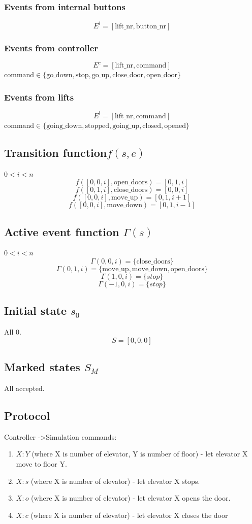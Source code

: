 \documentclass[12pt]{article}
\begin{document}
\subsubsection{Events from internal buttons}
\[ E^i = [\text{lift\_nr},\text{button\_nr}] \]

\subsubsection{Events from controller}
\[ E^c = [\text{lift\_nr}, \text{command}] \]
\(\text{command} \in \{\text{go\_down},\text{stop},\text{go\_up},\text{close\_door},\text{open\_door}\}\)

\subsubsection{Events from lifts}
\[ E^l = [\text{lift\_nr}, \text{command}] \]
\(\text{command} \in \{\text{going\_down},\text{stopped},\text{going\_up},\text{closed},\text{opened}\}\)

\subsection{Transition function\(f(s,e)\)}
\(0 < i < n\)
\[ f([0,0,i],\text{open\_doors}) = [0,1,i]\]
\[ f([0,1,i],\text{close\_doors}) = [0,0,i]\]
\[ f([0,0,i],\text{move\_up}) = [0,1,i+1]\]
\[ f([0,0,i],\text{move\_down}) = [0,1,i-1]\]

\subsection{Active event function \(\Gamma(s)\)}
\(0 < i < n\)
\[ \Gamma(0,0,i) = \{\text{close\_doors}\}\]
\[ \Gamma(0,1,i) = \{\text{move\_up},\text{move\_down},\text{open\_doors}\}\]
\[ \Gamma(1,0,i) = \{stop\}\]
\[ \Gamma(-1,0,i) = \{stop\}\]

\subsection{Initial state \(s_0\)}
All 0.
\[
  S = [0,0,0]
\]

\subsection{Marked states \(S_M\)}
All accepted.


\subsection{Protocol}
Controller -\textgreater Simulation commands:
\begin{enumerate}
	\item $X:Y$ (where X is number of elevator, Y is number of floor) - let elevator X move to floor Y.
	\item $X:s$ (where X is number of elevator) - let elevator X stops.
	\item $X:o$ (where X is number of elevator) - let elevator X opens the door.
	\item $X:c$ (where X is number of elevator) - let elevator X closes the door
\end{enumerate}
\end{document}
